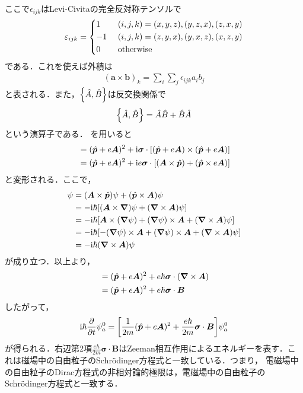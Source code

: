 \documentclass{report}
\begin{document}
ここで$\epsilon_{ijk}$はLevi-Civitaの完全反対称テンソルで
\begin{align}
  \epsilon_{ijk} = 
  \begin{dcases}
    1\ &(i,j,k) = (x,y,z),(y,z,x),(z,x,y)\\
    -1\ &(i,j,k) = (z,y,x),(y,x,z),(x,z,y)\\
    0\ &\text{otherwise}
  \end{dcases}
\end{align}
である．これを使えば外積は
\begin{align}
  (\bm{a} \times \bm{b})_k = \sum_{i} \sum_{j} \epsilon_{ijk} a_i b_j
\end{align}
と表される．また，$\qty{\hat{A},\hat{B}}$は反交換関係で
\begin{align}
  \qty{\hat{A},\hat{B}} = \hat{A}\hat{B} + \hat{B}\hat{A}
\end{align}
という演算子である．
を用いると
\begin{align}
  [\bm{\sigma}\cdot(\bm{p} + e\bm{A})][\bm{\sigma}\cdot(\bm{p} + e\bm{A})] &= (\hat{\bm{p}} + e\bm{A})^2 + \i \bm{\sigma} \cdot [(\hat{\bm{p}} + e\bm{A}) \times (\hat{\bm{p}} + e\bm{A})]\\
  &= (\hat{\bm{p}} + e\bm{A})^2 + \i e \bm{\sigma} \cdot [(\bm{A} \times \hat{\bm{p}}) + (\hat{\bm{p}} \times e\bm{A})]\\
\end{align}
と変形される．ここで，
\begin{align}
  [(\bm{A} \times \hat{\bm{p}}) + (\hat{\bm{p}} \times e\bm{A})]\psi &= (\bm{A} \times \hat{\bm{p}})\psi + (\hat{\bm{p}} \times \bm{A})\psi\\
  &= -\i \hbar \qty[(\bm{A} \times \grad) \psi + (\grad \times \bm{A}) \psi]\\
  &= -\i\hbar \qty[\bm{A} \times (\grad \psi) + (\grad\psi)\times \bm{A} + (\grad \times \bm{A}) \psi]\\
  &= -\i\hbar \qty[-(\grad\psi)\times \bm{A} + (\grad\psi)\times \bm{A} + (\grad \times \bm{A}) \psi]\\
  &= -\i\hbar(\grad \times \bm{A}) \psi
\end{align}
が成り立つ．以上より，
\begin{align}
  [\bm{\sigma}\cdot(\bm{p} + e\bm{A})][\bm{\sigma}\cdot(\bm{p} + e\bm{A})] &= (\hat{\bm{p}} + e\bm{A})^2 + e\hbar \bm{\sigma}\cdot(\grad \times \bm{A})\\
  &= (\hat{\bm{p}} + e\bm{A})^2 + e\hbar \bm{\sigma} \cdot \bm{B}
\end{align}
したがって，
\begin{align}
  \i\hbar \frac{\partial}{\partial t} \psi_a^0 = \qty[\frac{1}{2m} (\hat{\bm{p}} + e\bm{A})^2 + \frac{e\hbar}{2m}\bm{\sigma}\cdot\bm{B}] \psi_a^0
\end{align}
が得られる．右辺第2項$\frac{e\hbar}{2m}\bm{\sigma}\cdot\bm{B}$はZeeman相互作用によるエネルギーを表す．これは磁場中の自由粒子のSchrödinger方程式と一致している．つまり，
電磁場中の自由粒子のDirac方程式の非相対論的極限は，電磁場中の自由粒子のSchrödinger方程式と一致する．
\end{document}
